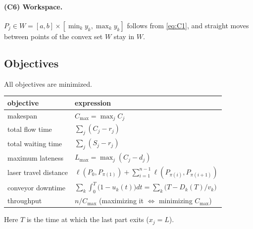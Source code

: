 \documentclass[11pt,a4paper]{article}
\theoremstyle{definition}
\theoremstyle{remark}
\begin{document}
\paragraph{(C6) Workspace.} $P_j\in W=[a,b]\times[\min_k y_k,\max_k y_k]$ follows from
\eqref{eq:C1}, and straight moves between points of the convex set $W$ stay in $W$.

\subsection{Objectives}
All objectives are minimized.

\begin{center}
\begin{tabular}{@{}ll@{}}
\toprule
objective & expression\\
\midrule
makespan & $C_{\max}=\max_j C_j$\\
total flow time & $\sum_j (C_j-r_j)$\\
total waiting time & $\sum_j (S_j-r_j)$\\
maximum lateness & $L_{\max}=\max_j (C_j-d_j)$\\
laser travel distance & $\ell(P_0,P_{\pi(1)})+\sum_{i=1}^{n-1}\ell(P_{\pi(i)},P_{\pi(i+1)})$\\
conveyor downtime & $\sum_k\int_0^{T}\bigl(1-u_k(t)\bigr)dt=\sum_k\bigl(T-D_k(T)/v_k\bigr)$\\
throughput & $n/C_{\max}$ (maximizing it $\Leftrightarrow$ minimizing $C_{\max}$)\\
\bottomrule
\end{tabular}
\end{center}
Here $T$ is the time at which the last part exits ($x_j=L$).
\end{document}
